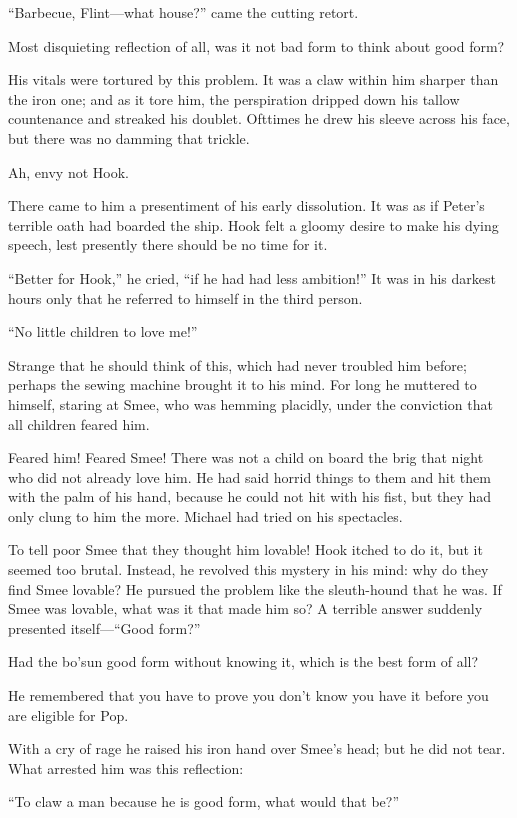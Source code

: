 ``Barbecue, Flint—what house?'' came the cutting retort.

Most disquieting reflection of all, was it not bad form to think about
good form?

His vitals were tortured by this problem. It was a claw within him
sharper than the iron one; and as it tore him, the perspiration dripped
down his tallow countenance and streaked his doublet. Ofttimes he drew
his sleeve across his face, but there was no damming that trickle.

Ah, envy not Hook.

There came to him a presentiment of his early dissolution. It was as if
Peter's terrible oath had boarded the ship. Hook felt a gloomy desire
to make his dying speech, lest presently there should be no time for
it.

``Better for Hook,'' he cried, ``if he had had less ambition!'' It was in
his darkest hours only that he referred to himself in the third person.

``No little children to love me!''

Strange that he should think of this, which had never troubled him
before; perhaps the sewing machine brought it to his mind. For long he
muttered to himself, staring at Smee, who was hemming placidly, under
the conviction that all children feared him.

Feared him! Feared Smee! There was not a child on board the brig that
night who did not already love him. He had said horrid things to them
and hit them with the palm of his hand, because he could not hit with
his fist, but they had only clung to him the more. Michael had tried on
his spectacles.

To tell poor Smee that they thought him lovable! Hook itched to do it,
but it seemed too brutal. Instead, he revolved this mystery in his
mind: why do they find Smee lovable? He pursued the problem like the
sleuth-hound that he was. If Smee was lovable, what was it that made
him so? A terrible answer suddenly presented itself—``Good form?''

Had the bo'sun good form without knowing it, which is the best form of
all?

He remembered that you have to prove you don't know you have it before
you are eligible for Pop.

With a cry of rage he raised his iron hand over Smee's head; but he did
not tear. What arrested him was this reflection:

``To claw a man because he is good form, what would that be?''

